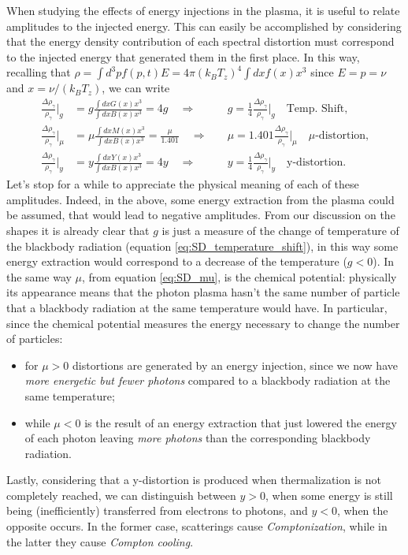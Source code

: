 When studying the effects of energy injections in the plasma, it is useful to relate amplitudes to the injected energy. This can easily be accomplished by considering that the energy density contribution of each spectral distortion must correspond to the injected energy that generated them in the first place. In this way, recalling that $\rho=\int d^3pf(p,t)E=4\pi (k_BT_z)^4\int dxf(x)x^3$ since $E=p=\nu$ and $x=\nu/(k_BT_z)$, we can write
\begin{subequations}
    \begin{align}
    \label{eq:SD_g_amplitude}\frac{\Delta \rho_\gamma}{\rho_\gamma}\bigg|_g&=g\frac{\int dxG(x)x^3}{\int dx B(x)x^3}=4g\quad\Rightarrow\quad &\boxed{g=\frac{1}{4}\frac{\Delta \rho_\gamma}{\rho_\gamma}\bigg|_g}\quad \text{Temp. Shift,}\\\label{eq:SD_mu_amplitude}
    \frac{\Delta \rho_\gamma}{\rho_\gamma}\bigg|_\mu&=\mu\frac{\int dxM(x)x^3}{\int dx B(x)x^3}=\frac{\mu}{1.401}\quad\Rightarrow\quad &\boxed{\mu=1.401\frac{\Delta \rho_\gamma}{\rho_\gamma}\bigg|_\mu}\quad\mu\text{-distortion,}\\\label{eq:SD_y_amplitude}
    \frac{\Delta \rho_\gamma}{\rho_\gamma}\bigg|_y&=y\frac{\int dxY(x)x^3}{\int dx B(x)x^3}=4y\quad\Rightarrow\quad &\boxed{y=\frac{1}{4}\frac{\Delta \rho_\gamma}{\rho_\gamma}\bigg|_y}\quad\text{y-distortion.}
\end{align}
\end{subequations}
Let's stop for a while to appreciate the physical meaning of each of these amplitudes. Indeed, in the above, some energy extraction from the plasma could be assumed, that would lead to negative amplitudes. From our discussion on the shapes it is already clear that $g$ is just a measure of the change of temperature of the blackbody radiation (equation \ref{eq:SD_temperature_shift}), in this way some energy extraction would correspond to a decrease of the temperature ($g<0$). In the same way  $\mu$, from equation \eqref{eq:SD_mu}, is the chemical potential: physically its appearance means that the photon plasma hasn't the same number of particle that a blackbody radiation at the same temperature would have. In particular, since the chemical potential measures the energy necessary to change the number of particles:
\begin{itemize}
    \item for $\mu>0$ distortions are generated by an energy injection, since we now have \emph{more energetic but fewer photons} compared to a blackbody radiation at the same temperature;
    \item while $\mu<0$ is the result of an energy extraction that just lowered the energy of each photon leaving \emph{more photons} than the corresponding blackbody radiation.
\end{itemize}
Lastly, considering that a y-distortion is produced when thermalization is not completely reached, we can distinguish between $y>0$, when some energy is still being (inefficiently) transferred from electrons to photons, and $y<0$, when the opposite occurs. In the former case, scatterings cause \emph{Comptonization}, while in the latter they cause \emph{Compton cooling}. 

